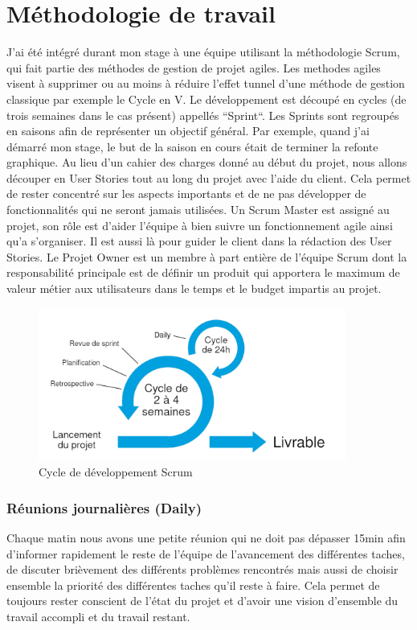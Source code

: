 \documentclass[12pt, a4paper]{report}
\begin{document}
\chapter{Méthodologie de travail}
J'ai été intégré durant mon stage à une équipe utilisant la méthodologie Scrum, qui fait partie des méthodes de gestion de projet agiles. Les methodes agiles visent à supprimer ou au moins à réduire l'effet tunnel d'une méthode de gestion classique par exemple le Cycle en V.\newline
Le développement est découpé en cycles (de trois semaines dans le cas présent) appellés ``Sprint``.\newline
Les Sprints sont regroupés en saisons afin de représenter un objectif général.
Par exemple, quand j'ai démarré mon stage, le but de la saison en cours était de terminer la refonte graphique.
Au lieu d'un cahier des charges donné au début du projet, nous allons découper en User Stories tout au long du projet avec l'aide du client.\newline
Cela permet de rester concentré sur les aspects importants et de ne pas développer de fonctionnalités qui ne seront jamais utilisées.\newline
Un Scrum Master est assigné au projet, son rôle est d'aider l'équipe à bien suivre un fonctionnement agile ainsi qu'a s'organiser. Il est aussi là pour guider le client dans la rédaction des User Stories.
Le Projet Owner est un membre à part entière de l’équipe Scrum dont la responsabilité principale est de définir un produit qui apportera le maximum de valeur métier aux utilisateurs dans le temps et le budget impartis au projet.
\begin{figure}[H]
    \begin{center}
        \includegraphics[width=0.9\textwidth]{scrum.jpg}
    \end{center}
    \caption{Cycle de développement Scrum}
\end{figure}
\subsection{Réunions journalières (Daily)}
Chaque matin nous avons une petite réunion qui ne doit pas dépasser 15min afin d'informer rapidement le reste de l'équipe de l'avancement des différentes taches, de discuter brièvement des différents problèmes rencontrés mais aussi de choisir ensemble la priorité des différentes taches qu'il reste à faire.\newline
Cela permet de toujours rester conscient de l'état du projet et d'avoir une vision d'ensemble du travail accompli et du travail restant.
\end{document}
